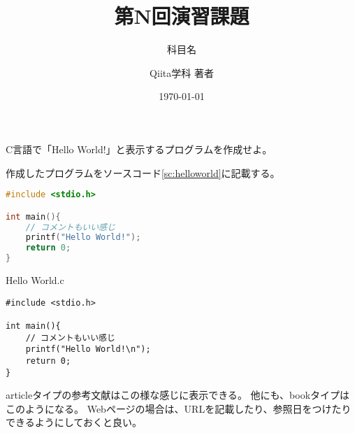 \documentclass[uplatex,dvipdfmx,11pt,a4paper]{jsarticle} %
\title{第N回演習課題}
\subtitle{科目名}
\author{Qiita学科 著者}
\institute{学籍番号:12345678}
\date{\today}
\begin{document}
\maketitle

\begin{problem}
    C言語で「Hello World!」と表示するプログラムを作成せよ。
\end{problem}

作成したプログラムをソースコード\ref{sc:helloworld}に記載する。

% 

\begin{lstlisting}[language=c, caption=Hello Worldを表示するプログラム, label=sc:helloworld]
#include <stdio.h>

int main(){
    // コメントもいい感じ
    printf("Hello World!");
    return 0;
}
\end{lstlisting}

    
\begin{listing}[htbp]
\caption{Hello World.c}
\label{sc:helloworld}
    
\begin{verbatim}
#include <stdio.h>

int main(){
    // コメントもいい感じ
    printf("Hello World!\n");
    return 0;
}
\end{verbatim}

\end{listing}

articleタイプの参考文献はこの様な感じに表示できる\cite{jpArticle3,enArticle3}。
他にも、bookタイプはこのようになる\cite{jpBook1}。
Webページの場合は、URLを記載したり、参照日をつけたりできるようにしておくと良い\cite{example}。


\end{document}
